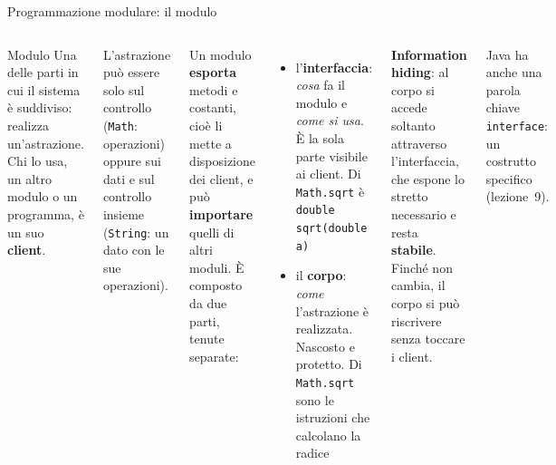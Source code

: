 \documentclass[10pt,aspectratio=169]{beamer}
\begin{document}
\begin{frame}[fragile]{Programmazione modulare: il modulo}
\begin{columns}[T]
\begin{block}{Modulo}
Una delle parti in cui il sistema è suddiviso: realizza un'astrazione. Chi lo usa, un altro modulo o un programma, è un suo \textbf{client}.
\end{block}

\small
L'astrazione può essere solo sul controllo (\texttt{Math}: operazioni) oppure sui dati e sul controllo insieme (\texttt{String}: un dato con le sue operazioni).

\vspace{0.08cm}
Un modulo \textbf{esporta} metodi e costanti, cioè li mette a disposizione dei client, e può \textbf{importare} quelli di altri moduli. È composto da due parti, tenute separate:
\begin{itemize}\itemsep=2pt
    \item l'\textbf{interfaccia}: \emph{cosa} fa il modulo e \emph{come si usa}. È la sola parte visibile ai client. Di \texttt{Math.sqrt} è \texttt{double sqrt(double a)}
    \item il \textbf{corpo}: \emph{come} l'astrazione è realizzata. Nascosto e protetto. Di \texttt{Math.sqrt} sono le istruzioni che calcolano la radice
\end{itemize}

\textbf{Information hiding}: al corpo si accede soltanto attraverso l'interfaccia, che espone lo stretto necessario e resta \textbf{stabile}. Finché non cambia, il corpo si può riscrivere senza toccare i client.

\footnotesize
Java ha anche una parola chiave \texttt{interface}: un costrutto specifico (lezione~9).
\end{columns}
\end{frame}
\end{document}
